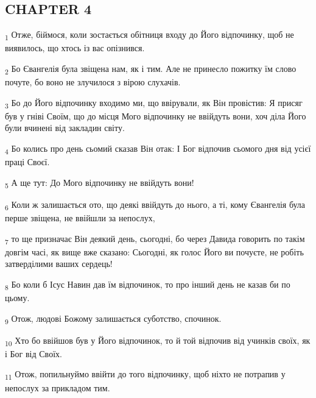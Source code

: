 \subsection{CHAPTER 4}
\begin{tcolorbox}
\textsubscript{1} Отже, біймося, коли зостається обітниця входу до Його відпочинку, щоб не виявилось, що хтось із вас опізнився.
\end{tcolorbox}
\begin{tcolorbox}
\textsubscript{2} Бо Євангелія була звіщена нам, як і тим. Але не принесло пожитку їм слово почуте, бо воно не злучилося з вірою слухачів.
\end{tcolorbox}
\begin{tcolorbox}
\textsubscript{3} Бо до Його відпочинку входимо ми, що ввірували, як Він провістив: Я присяг був у гніві Своїм, що до місця Мого відпочинку не ввійдуть вони, хоч діла Його були вчинені від закладин світу.
\end{tcolorbox}
\begin{tcolorbox}
\textsubscript{4} Бо колись про день сьомий сказав Він отак: І Бог відпочив сьомого дня від усієї праці Своєї.
\end{tcolorbox}
\begin{tcolorbox}
\textsubscript{5} А ще тут: До Мого відпочинку не ввійдуть вони!
\end{tcolorbox}
\begin{tcolorbox}
\textsubscript{6} Коли ж залишається ото, що деякі ввійдуть до нього, а ті, кому Євангелія була перше звіщена, не ввійшли за непослух,
\end{tcolorbox}
\begin{tcolorbox}
\textsubscript{7} то ще призначає Він деякий день, сьогодні, бо через Давида говорить по такім довгім часі, як вище вже сказано: Сьогодні, як голос Його ви почуєте, не робіть затверділими ваших сердець!
\end{tcolorbox}
\begin{tcolorbox}
\textsubscript{8} Бо коли б Ісус Навин дав їм відпочинок, то про інший день не казав би по цьому.
\end{tcolorbox}
\begin{tcolorbox}
\textsubscript{9} Отож, людові Божому залишається суботство, спочинок.
\end{tcolorbox}
\begin{tcolorbox}
\textsubscript{10} Хто бо ввійшов був у Його відпочинок, то й той відпочив від учинків своїх, як і Бог від Своїх.
\end{tcolorbox}
\begin{tcolorbox}
\textsubscript{11} Отож, попильнуймо ввійти до того відпочинку, щоб ніхто не потрапив у непослух за прикладом тим.
\end{tcolorbox}
